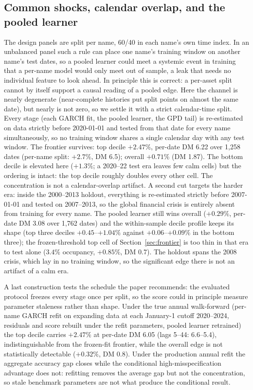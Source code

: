 \documentclass[11pt]{article}
\theoremstyle{remark}
\begin{document}
\subsection{Common shocks, calendar overlap, and the pooled learner}
\label{sec:calendarleak}

The design panels are split per name, 60/40 in each name's own time
index. In an unbalanced panel such a rule can place one name's
training window on another name's test dates, so a pooled learner
could meet a systemic event in training that a per-name model would only meet out of sample, a leak that needs no individual feature
to look ahead. In principle this is correct: a per-asset split
cannot by itself support a causal reading of a pooled edge. Here the
channel is nearly degenerate (near-complete histories put split
points on almost the same date), but nearly is not zero, so we settle it
with a strict calendar-time split. Every stage (each GARCH fit, the pooled learner, the GPD tail) is re-estimated on data strictly before 2020-01-01 and tested from that date for
every name simultaneously, so no training window shares a single
calendar day with any test window. The frontier survives: top decile
$+2.47\%$, per-date DM 6.22 over 1{,}258 dates (per-name split:
$+2.7\%$, DM 6.5); overall $+0.71\%$ (DM 1.87). The bottom decile is
elevated here ($+1.3\%$; a 2020--22 test era leaves few calm cells)
but the ordering is intact: the top decile roughly doubles every
other cell. The concentration is not a calendar-overlap artifact.
A second cut targets the harder era: inside the 2000--2013 holdout,
everything is re-estimated strictly before 2007-01-01 and tested on
2007--2013, so the global financial crisis is entirely absent from
training for every name. The pooled learner still wins overall
($+0.29\%$, per-date DM 3.08 over 1{,}762 dates) and the
within-sample decile profile keeps its shape (top three deciles
$+0.45$--$+1.04\%$ against $+0.06$--$+0.09\%$ in the bottom three);
the frozen-threshold top cell of Section~\ref{sec:frontier} is too
thin in that era to test alone ($3.4\%$ occupancy, $+0.85\%$, DM
0.7). The holdout spans the 2008 crisis, which lay in no training window,
so the significant edge there is not an artifact of a calm era.

A last construction tests the schedule the paper recommends: the
evaluated protocol freezes every stage once per split, so the score
could in principle measure parameter staleness rather than shape.
Under the true annual walk-forward (per-name GARCH refit on
expanding data at each January-1 cutoff 2020--2024, residuals and
score rebuilt under the refit parameters, pooled learner retrained) the top decile carries $+2.47\%$ at per-date DM 6.05 (lags 5--44:
6.6--5.4), indistinguishable from the frozen-fit frontier, while the
overall edge is not statistically detectable ($+0.32\%$, DM 0.8).
Under the production annual refit the aggregate accuracy gap closes
while the conditional high-misspecification advantage does not: refitting removes
the average gap but not the concentration, so stale benchmark
parameters are not what produce the conditional result.
\end{document}
